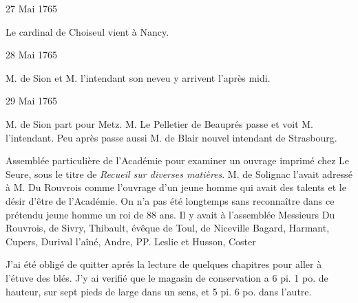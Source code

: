                      \begin{diary}{27 Mai 1765}{}


                           Le cardinal de Choiseul vient à
                              Nancy. \bigskip


                     \end{diary}
                     \begin{diary}{28 Mai 1765}{}


                           M. de Sion et M. l'intendant son neveu
                           y arrivent l'après midi. \bigskip


                     \end{diary}
                     \begin{diary}{29 Mai 1765}{}


                           M. de Sion part pour Metz. M. Le Pelletier
                              de Beauprés passe et voit M. l'intendant.
                           Peu après passe aussi M. de Blair
                           nouvel intendant de Strasbourg. \bigskip


                         Assemblée particulière de l'Académie pour
                           examiner un ouvrage imprimé chez
                           Le Seure,
                           sous le titre de \emph{\emph{Recueil sur
                                 diverses matières}}.
                           M. de Solignac l'avait
                           adressé à M. Du Rouvrois
                           comme l'ouvrage d'un jeune homme qui avait
                           des talents et le désir d'être de l'Académie. On
                           n'a pas été longtemps sans reconnaître dans ce
                           prétendu jeune homme un roi
                              de 88 ans.
                           Il y avait à l'assemblée Messieurs
                           Du Rouvrois,
                           de Sivry, Thibault, évêque de Toul, de
                              Niceville
                           Bagard, Harmant, Cupers,
                              Durival l'aîné,
                           Andre, PP. Leslie et Husson,
                              Coster
                        \bigskip


                         J'ai été obligé de quitter aprés la
                           lecture de
                           quelques chapitres pour aller à l'étuve des
                              blés. J'y
                           ai verifié que le magasin de
                           conservation a 6 pi. 1 po.
                           de hauteur, sur
                           sept pieds de large dans un
                           sens, et 5 pi. 6 po.
                           dans l'autre. \bigskip



\end{diary}
